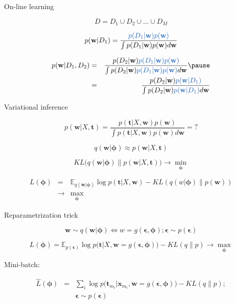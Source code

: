 \documentclass[14pt,mathserif,aspectratio=43,unicode]{beamer}
\newcommand{\w}{\mathbf{w}}
\newcommand{\T}{\mathbf{t}}
\newcommand{\x}{\mathbf{x}}
\newcommand{\pHi}{\mathbf{\phi}}
\newcommand{\Eps}{\mathbf{\epsilon}}
\begin{document}
\begin{frame}{On-line learning}

    $$ D = D_1 \cup D_2 \cup \dots \cup D_M $$
    
    \pause
    
    $$ p(\w | D_1) = \frac{{\color{lab-blue}p(D_1|\w)p(\w)}}{\int p(D_1|\w)p(\w)d\w} $$
    
    \pause

    \begin{eqnarray*}
        p(\w | D_1, D_2) 
        & = & 
        \frac{p(D_2|\w){\color{lab-blue}p(D_1|\w)p(\w)}}{\int p(D_2|\w){\color{lab-blue}p(D_1|\w)p(\w)}d\w}
        \pause
        \\  
        & = &
        \frac{p(D_2|\w){\color{lab-blue}p(\w|D_1)}}{\int p(D_2|\w){\color{lab-blue}p(\w|D_1)}d\w}
    \end{eqnarray*}

\end{frame}


\begin{frame}{Variational inference}

    $$ p(\w | X, \T) = \frac{p(\T|X,\w)p(\w)}{\int p(\T|X, \w) p(\w) d \w} = ? $$
    
    \pause
    
    $$ q(\w|\pHi) \approx p(\w|X, \T) $$
    
    $$ KL\big(q(\w|\pHi) \| p(\w|X, \T)\big) \rightarrow \min_{\pHi} $$
    
    \pause

    \begin{eqnarray*}
        L(\pHi) 
        & = & 
        \mathbb{E}_{q(\w|\pHi)} \log p(\T|X,\w) - KL(q(w|\pHi)\|p(\w))
        \\  
        & \rightarrow &
        \max_{\pHi}
    \end{eqnarray*}

\end{frame}

\begin{frame}{Reparametrization trick}

    $$ \w \sim q(\w|\pHi) \iff w = g(\Eps, \pHi); \Eps \sim p(\Eps) $$
    
    \pause
    
    $$ L(\pHi) = \mathbb{E}_{p(\Eps)} \log p\big(\T|X,\w=g(\Eps, \pHi)\big) - KL(q\|p) \rightarrow \max_{\pHi} $$
    
    Mini-batch:
    
    \begin{eqnarray*}
        \hat{L}(\pHi)
        & = & 
        \sum_i \log p\big(\T_{m_i}|\x_{m_i},\w=g(\Eps, \pHi)\big) - KL(q\|p);
        \\  
        & &
        \Eps \sim p(\Eps)
    \end{eqnarray*}

\end{frame}
\end{document}
